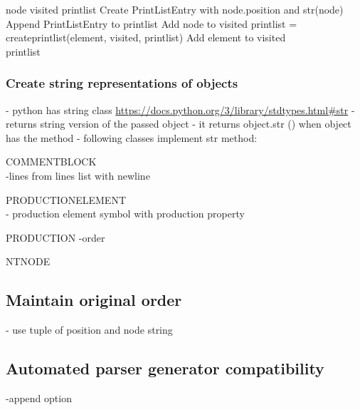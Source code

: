 \begin{algorithm}[H]
\caption{Output Algorithm: create\textunderscore print\textunderscore list}\label{alg:OutputCreatePrintList}
\begin{algorithmic}[1] 
\Require node
\Require visited
\Require print\textunderscore list
\State Create PrintListEntry with node.position and str(node)
\State Append PrintListEntry to print\textunderscore list
\State Add node to visited
			\State print\textunderscore list = create\textunderscore print\textunderscore list(element, visited, print\textunderscore list)
			\State Add element to visited
		\EndIf
	\EndFor
\EndFor \\
\Return print\textunderscore list
\end{algorithmic}
\end{algorithm}

\subsubsection{Create string representations of objects}\label{sec:ImplementationOutputGrammarGraphStringRepresentations}

- python has string class \url{https://docs.python.org/3/library/stdtypes.html#str}
- returns string version of the passed object
- it returns object.\textunderscore \textunderscore str \textunderscore \textunderscore () when object has the method
- following classes implement str method:

COMMENT\textunderscore  BLOCK \\
-lines from lines list with newline

PRODUCTION\textunderscore ELEMENT \\
- production element symbol with production property 

PRODUCTION
-order

NTNODE

\subsection{Maintain original order}\label{sec:ImplementationOutputGrammarGraphMaintainOrder}
- use tuple of position and node string


\subsection{Automated parser generator compatibility}\label{sec:ImplementationAutomatedParserGenerator}
-append option

